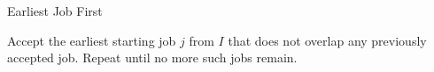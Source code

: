 \begin{algorithm}
\caption{Earliest Job First}
\begin{algorithmic}
\STATE Accept the earliest starting job $j$ from $I$ that does not overlap any previously accepted job.
\STATE Repeat until no more such jobs remain.
\ENDPROCEDURE
\end{algorithmic}
\end{algorithm}